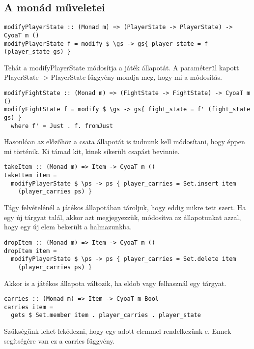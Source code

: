 \documentclass[12pt,a4paper,oneside]{report}
\begin{document}
    \subsection{A monád műveletei}
    \begin{verbatim}
modifyPlayerState :: (Monad m) => (PlayerState -> PlayerState) -> CyoaT m ()
modifyPlayerState f = modify $ \gs -> gs{ player_state = f (player_state gs) }
    \end{verbatim}
    Tehát a modifyPlayerState módosítja a játék állapotát. A
    paraméterül kapott PlayerState -> PlayerState függvény mondja meg,
    hogy mi a módosítás.
    \begin{verbatim}
modifyFightState :: (Monad m) => (FightState -> FightState) -> CyoaT m ()
modifyFightState f = modify $ \gs -> gs{ fight_state = f' (fight_state gs) }
  where f' = Just . f. fromJust
      \end{verbatim}
    Hasonlóan az előzőhöz a csata állapotát is tudnunk kell
    módosítani, hogy éppen mi történik. Ki támad kit, kinek sikerült
    csapást bevinnie.

    \begin{verbatim}
takeItem :: (Monad m) => Item -> CyoaT m ()
takeItem item =
  modifyPlayerState $ \ps -> ps { player_carries = Set.insert item
    (player_carries ps) }
    \end{verbatim}
    Tágy felvételénél a játékos állapotában tároljuk, hogy eddig mikre
    tett szert. Ha egy új tárgyat talál, akkor azt
    megjegyezzük, módosítva az állapotunkat azzal, hogy egy új elem
    bekerült a halmazunkba.

    \begin{verbatim}
dropItem :: (Monad m) => Item -> CyoaT m ()
dropItem item =
  modifyPlayerState $ \ps -> ps { player_carries = Set.delete item
    (player_carries ps) }
    \end{verbatim}
    Akkor is a játékos állapota változik, ha eldob vagy felhasznál egy tárgyat.

    \begin{verbatim}
carries :: (Monad m) => Item -> CyoaT m Bool
carries item =
  gets $ Set.member item . player_carries . player_state
    \end{verbatim}
    Szükségünk lehet lekédezni, hogy egy adott elemmel
    rendelkezünk-e. Ennek segítségére van ez a carries függvény.
\end{document}
